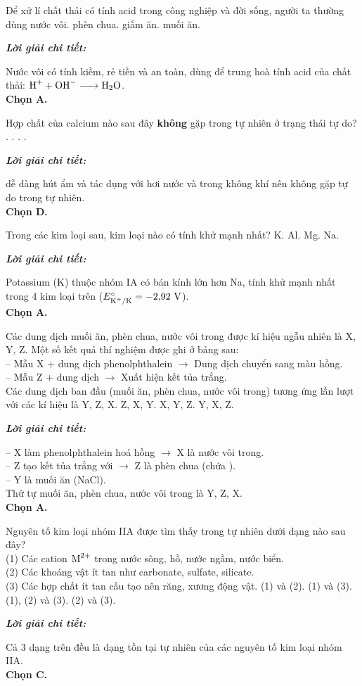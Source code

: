 \documentclass[11pt,a4paper]{article}
\def\loigiai#1{
\par\begingroup\color{blue!80!black}\small
\noindent\textbf{\textit{Lời giải chi tiết:}}\par
#1\par\endgroup}
\begin{document}
\begin{ex}
Để xử lí chất thải có tính acid trong công nghiệp và đời sống, người ta thường dùng
\choice
{\True nước vôi.}
{phèn chua.}
{giấm ăn.}
{muối ăn.}
\loigiai{
Nước vôi  có tính kiềm, rẻ tiền và an toàn, dùng để trung hoà tính acid của chất thải: $\ce{H+ + OH- -> H2O}$.\\
\textbf{Chọn A.}}
\end{ex}

\begin{ex}
Hợp chất của calcium nào sau đây \textbf{không} gặp trong tự nhiên ở trạng thái tự do?
\choice
{.}
{.}
{.}
{\True {}.}
\loigiai{
\ce{CaO} dễ dàng hút ẩm và tác dụng với hơi nước và \ce{CO2} trong không khí nên không gặp tự do trong tự nhiên.\\
\textbf{Chọn D.}}
\end{ex}



\begin{ex}
Trong các kim loại sau, kim loại nào có tính khử mạnh nhất?
\choice
{\True K.}
{Al.}
{Mg.}
{Na.}
\loigiai{
Potassium (K) thuộc nhóm IA có bán kính lớn hơn Na, tính khử mạnh nhất trong 4 kim loại trên ($E^\circ_{\ce{K+/K}} = -2{,}92\text{ V}$).\\
\textbf{Chọn A.}}
\end{ex}

\begin{ex}
Các dung dịch muối ăn, phèn chua, nước vôi trong được kí hiệu ngẫu nhiên là X, Y, Z. Một số kết quả thí nghiệm được ghi ở bảng sau:\\
-- Mẫu X + dung dịch phenolphthalein $\rightarrow$ Dung dịch chuyển sang màu hồng.\\
-- Mẫu Z + dung dịch  $\rightarrow$ Xuất hiện kết tủa trắng.\\
Các dung dịch ban đầu (muối ăn, phèn chua, nước vôi trong) tương ứng lần lượt với các kí hiệu là
\choice
{\True Y, Z, X.}
{Z, X, Y.}
{X, Y, Z.}
{Y, X, Z.}
\loigiai{
-- X làm phenolphthalein hoá hồng $\rightarrow$ X là nước vôi trong.\\
-- Z tạo kết tủa trắng với \ce{BaCl2} $\rightarrow$ Z là phèn chua (chứa \ce{SO4^2-}).\\
-- Y là muối ăn (NaCl).\\
Thứ tự muối ăn, phèn chua, nước vôi trong là Y, Z, X.\\
\textbf{Chọn A.}}
\end{ex}

\begin{ex}
Nguyên tố kim loại nhóm IIA được tìm thấy trong tự nhiên dưới dạng nào sau đây?\\
(1) Các cation $\ce{M^2+}$ trong nước sông, hồ, nước ngầm, nước biển.\\
(2) Các khoáng vật ít tan như carbonate, sulfate, silicate.\\
(3) Các hợp chất ít tan cấu tạo nên răng, xương động vật.
\choice
{(1) và (2).}
{(1) và (3).}
{\True (1), (2) và (3).}
{(2) và (3).}
\loigiai{
Cả 3 dạng trên đều là dạng tồn tại tự nhiên của các nguyên tố kim loại nhóm IIA.\\
\textbf{Chọn C.}}
\end{ex}
\end{document}
